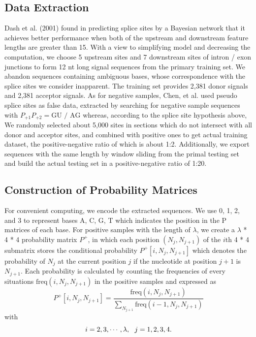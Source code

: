 \documentclass[journal,twoside]{IEEEtran}
\begin{document}
\subsection{Data Extraction}\label{2.2}

Dash et al. (2001) \cite{dash2001modeling} found in predicting splice sites by a Bayesian network that it achieves better performance when both of the upstream and downstream feature lengths are greater than 15. With a view to simplifying model and decreasing the computation, we choose 5 upstream sites and 7 downstream sites of intron / exon junctions to form 12 nt long signal sequences from the primary training set. We abandon sequences containing ambiguous bases, whose correspondence with the splice sites we consider inapparent. The training set provides 2,381 donor signals and 2,381 acceptor signals. As for negative samples, Chen, et al. \cite{chen2005prediction} used pseudo splice sites as false data, extracted by searching for negative sample sequences with $P_{+1}P_{+2} = \text{GU / AG}$ whereas, according to the splice site hypothesis above, We randomly selected about 5,000 sites in sections which do not intersect with all donor and acceptor sites, and combined with positive ones to get actual training dataset, the positive-negative ratio of which is about 1:2. Additionally, we export sequences with the same length by window sliding from the primal testing set and build the actual testing set in a positive-negative ratio of 1:20.

\subsection{Construction of Probability Matrices}\label{2.3}

For convenient computing, we encode the extracted sequences. We use 0, 1, 2, and 3 to represent bases A, C, G, T which indicates the position in the P matrices of each base. For positive samples with the length of $\lambda$, we create a $\lambda$ * 4 * 4 probability matrix $P^+$, in which each position  $(N_j, N_{j+1})$ of the $i$th 4 * 4 submatrix stores the conditional probability $P^+[i, N_j, N_{j+1}]$ which denotes the probability of $N_j$ at the current position $j$ if the nucleotide at position $j+1$ is $N_{j+1}$. Each probability is calculated by counting the frequencies of every situations $\text{freq}(i, N_j, N_{j+1})$ in the positive samples and expressed as
\begin{equation}
P^+[i, N_j, N_{j+1}] = \displaystyle\frac{\text{freq}(i, N_j, N_{j+1})}{\sum\limits_{N_{j+1}}\text{freq}(i-1, N_j, N_{j+1})}
\label{eq1}
\end{equation}
with
\begin{equation}
i = 2, 3, \cdots, \lambda, \ \ j = 1, 2, 3, 4. \notag
\end{equation}
\end{document}
